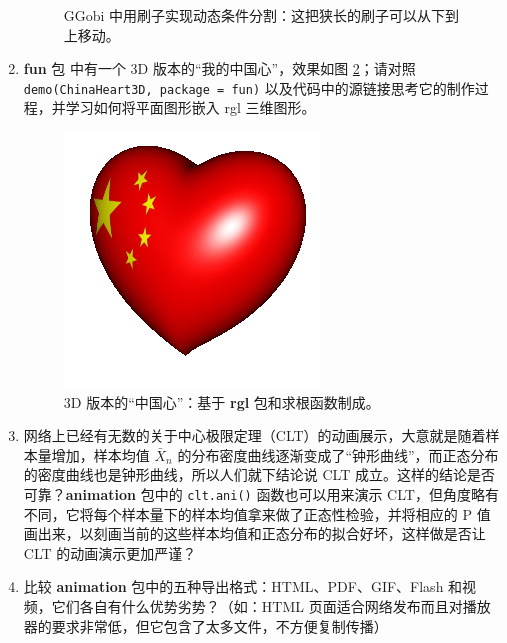 \documentclass[
  b5paper,
  UTF8,twoside]{book}
\begin{document}
\begin{enumerate}
\begin{figure}
{   }

   \caption[GGobi 中用刷子实现动态条件分割]{GGobi 中用刷子实现动态条件分割：这把狭长的刷子可以从下到上移动。}\label{fig:GGobi-narrow-brush}
   \end{figure}
\item
  \textbf{fun} 包 \citep{fun} 中有一个 3D 版本的``我的中国心''，效果如图 \ref{fig:China-Heart-3D}；请对照 \texttt{demo(\textquotesingle{}ChinaHeart3D\textquotesingle{},\ package\ =\ \textquotesingle{}fun\textquotesingle{})} 以及代码中的源链接思考它的制作过程，并学习如何将平面图形嵌入 rgl 三维图形。

  \begin{figure}

   {\centering \includegraphics{images/China-Heart-3D} 

   }

   \caption{3D 版本的``中国心''：基于 \textbf{rgl} 包和求根函数制成。}\label{fig:China-Heart-3D}
   \end{figure}
\item
  网络上已经有无数的关于中心极限定理（CLT）的动画展示，大意就是随着样本量增加，样本均值 \(\bar{X}_{n}\) 的分布密度曲线逐渐变成了``钟形曲线''，而正态分布的密度曲线也是钟形曲线，所以人们就下结论说 CLT 成立。这样的结论是否可靠？\textbf{animation} 包中的 \texttt{clt.ani()} 函数也可以用来演示 CLT，但角度略有不同，它将每个样本量下的样本均值拿来做了正态性检验，并将相应的 P 值画出来，以刻画当前的这些样本均值和正态分布的拟合好坏，这样做是否让 CLT 的动画演示更加严谨？
\item
  比较 \textbf{animation} 包中的五种导出格式：HTML、PDF、GIF、Flash 和视频，它们各自有什么优势劣势？（如：HTML 页面适合网络发布而且对播放器的要求非常低，但它包含了太多文件，不方便复制传播）
\end{enumerate}
\end{document}
